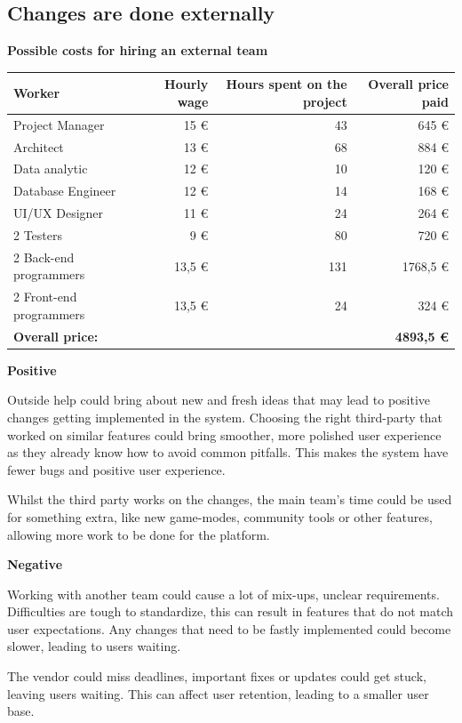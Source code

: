 \documentclass[11pt,a4paper]{article}
\newcommand{\heading}[1]{\vspace{1em}\noindent\textbf{#1}\par\vspace{0.5em}}
\begin{document}
\subsection{Changes are done externally}
\heading{Possible costs for hiring an external team}
\begin{table}[h!]
    \centering
    \begin{tabular}{lrrr}
        \toprule
        Worker & Hourly wage & Hours spent on the project & Overall price paid \\
        \midrule
        Project Manager & 15 € & 43 & 645 € \\
        Architect & 13 € & 68 & 884 € \\
        Data analytic & 12 € & 10 & 120 € \\
        Database Engineer & 12 € & 14 & 168 € \\
        UI/UX Designer & 11 € & 24 & 264 € \\
        2 Testers & 9 € & 80 & 720 € \\
        2 Back-end programmers & 13,5 € & 131 & 1768,5 € \\
        2 Front-end programmers & 13,5 € & 24 & 324 € \\
        \midrule
        \textbf{Overall price:} & & & \textbf{4893,5 €} \\
        \bottomrule
    \end{tabular}
\end{table}

\heading{Positive}
Outside help could bring about new and fresh ideas that may lead to positive changes getting implemented in the system. Choosing the right third-party that worked on similar features could bring smoother, more polished user experience as they already know how to avoid common pitfalls. This makes the system have fewer bugs and positive user experience.

Whilst the third party works on the changes, the main team's time could be used for something extra, like new game-modes, community tools or other features, allowing more work to be done for the platform.

\heading{Negative}
Working with another team could cause a lot of mix-ups, unclear requirements. Difficulties are tough to standardize, this can result in features that do not match user expectations. Any changes that need to be fastly implemented could become slower, leading to users waiting.

The vendor could miss deadlines, important fixes or updates could get stuck, leaving users waiting. This can affect user retention, leading to a smaller user base.
\end{document}
